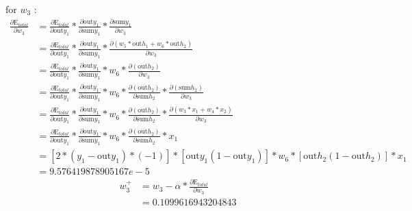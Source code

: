 \documentclass[a4paper, article, oneside, USenglish, IN5460]{memoir}
\begin{document}
{\newline
for $w_3$ :
\begin{equation}
\begin{aligned}
\frac{\partial \text{E}_{total}  }{\partial w_3} &= \frac{\partial \text{E}_{total}}{\partial \text{out}y_1} *\frac{\partial  \text{out}y_1}{\partial \text{sum}y_1}*\frac{\partial \text{sum}y_1}{\partial  w_3} \\
&= \frac{\partial \text{E}_{total}}{\partial \text{out}y_1} *\frac{\partial  \text{out}y_1}{\partial \text{sum}y_1}*\frac{\partial ( w_5*\text{out}h_1 + w_6*\text{out}h_2 )} {\partial w_3} \\
&= \frac{\partial \text{E}_{total}}{\partial \text{out}y_1} * \frac{\partial \text{out}y_1}{\partial \text{sum}y_1} *{w_6}* \frac{\partial ( \text{out}h_2 )} {\partial w_3}\\
&= \frac{\partial \text{E}_{total}}{\partial \text{out}y_1} * \frac{\partial \text{out}y_1}{\partial \text{sum}y_1} *{w_6}* \frac{\partial ( \text{out}h_2 )}{\partial \text{sum}h_2} * \frac{\partial ( \text{sum}h_2)}{\partial w_3}\\
&= \frac{\partial \text{E}_{total}}{\partial \text{out}y_1} * \frac{\partial \text{out}y_1}{\partial \text{sum}y_1} *{w_6}* \frac{\partial ( \text{out}h_2 )}{\partial \text{sum}h_2} * \frac{\partial ( w_3*x_1 + w_4*x_2)}{\partial w_3}\\
&= \frac{\partial \text{E}_{total}}{\partial \text{out}y_1} * \frac{\partial \text{out}y_1}{\partial \text{sum}y_1} *{w_6}* \frac{\partial ( \text{out}h_2 )}{\partial \text{sum}h_2} *  {x_1}\\
&= [2*(y_1 -\text{out}y_1)*(-1)] * [\text{out}y_1(1-\text{out}y_1)] *{w_6}* [\text{out}h_2 (1-\text{out}h_2)]*  {x_1}\\
& = 9.576419878905167e-5
\end{aligned}
\end{equation}
\begin{equation}
\begin{aligned}
w^+_3 &= w_3 - \alpha * \frac{\partial \text{E}_{total}  }{\partial w_3} \\
& =  0.1099616943204843
\end{aligned}
\end{equation}

}
\end{document}
